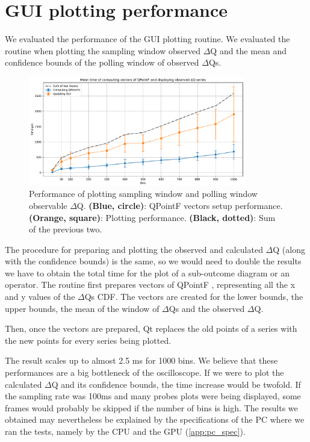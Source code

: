 \section{GUI plotting performance}
    We evaluated the performance of the GUI plotting routine. We evaluated the routine when plotting the sampling window observed $\Delta$Q and the mean and confidence bounds of the polling window of observed $\Delta$Qs. 
    \begin{figure}[H]
        \begin{center}
            \includegraphics[width = 0.85\textwidth]{img/plots.pdf}
        \end{center}
        \caption{Performance of plotting sampling window and polling window observable $\Delta$Q. \textbf{(Blue, circle)}: QPointF vectors setup performance. \textbf{(Orange, square)}: Plotting performance. \textbf{(Black, dotted)}: Sum of the previous two.}
    \end{figure}
    The procedure for preparing and plotting the observed and calculated $\Delta$Q (along with the confidence bounds) is the same, so we would need to double the results we have to obtain the total time for the plot of a sub-outcome diagram or an operator.
    The routine first prepares vectors of QPointF \cite{qpointf}, representing all the x and y values of the $\Delta$Qs CDF. The vectors are created for the lower bounds, the upper bounds, the mean of the window of $\Delta$Qs and the observed $\Delta$Q.

    Then, once the vectors are prepared, Qt replaces the old points of a series with the new points for every series being plotted.

    The result scales up to almost 2.5 ms for 1000 bins. We believe that these performances are a big bottleneck of the oscilloscope. If we were to plot the calculated $\Delta$Q and its confidence bounds, the time increase would be twofold. If the sampling rate was 100ms and many probes plots were being displayed, some frames would probably be skipped if the number of bins is high. The results we obtained may nevertheless be explained by the specifications of the PC where we ran the tests, namely by the CPU and the GPU (\cref{app:pc_spec}).
